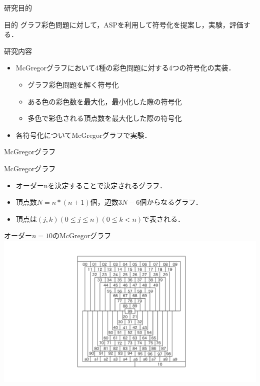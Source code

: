 \documentclass[dvipdfmx,11pt]{beamer}
\begin{document}

\begin{frame}{研究目的}
 \begin{alertblock}{目的}
  グラフ彩色問題に対して，ASPを利用して符号化を提案し，実験，評価する．
 \end{alertblock}

 \begin{block}{研究内容}
  \begin{itemize}
   \item McGregorグラフにおいて4種の彩色問題に対する4つの符号化の実装．
         \begin{itemize}
          \item グラフ彩色問題を解く符号化
          \item ある色の彩色数を最大化，最小化した際の符号化
          \item 多色で彩色される頂点数を最大化した際の符号化
         \end{itemize}
   \item 各符号化についてMcGregorグラフで実験．
  \end{itemize}
 \end{block}
\end{frame}


\begin{frame}{McGregorグラフ}
 \begin{block}{McGregorグラフ}
  \begin{itemize}
   \item オーダーnを決定することで決定されるグラフ．
   \item 頂点数$N=n*(n+1)$個，辺数$3N-6$個からなるグラフ．
   \item 頂点は$(j,k)(0\leq j \leq n) (0 \leq k < n)$で表される．
  \end{itemize}
 \end{block}
 \begin{exampleblock}{オーダー$n=10$のMcGregorグラフ}
    \centering
    \includegraphics[keepaspectratio, scale=0.15]{graph2.pdf}
 \end{exampleblock}
 
\end{frame}
\end{document}
